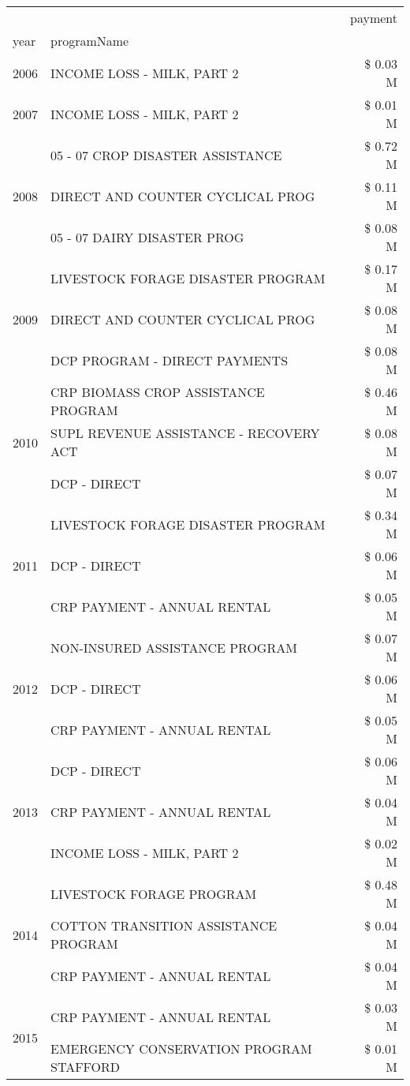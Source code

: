 \begin{tabular}{llr}
\toprule
 &  & payment \\
year & programName &  \\
\midrule
2006 & INCOME LOSS - MILK, PART 2 & \$ 0.03 M \\
\cline{1-3}
2007 & INCOME LOSS - MILK, PART 2 & \$ 0.01 M \\
\cline{1-3}
\multirow[t]{3}{*}{2008} & 05 - 07 CROP DISASTER ASSISTANCE & \$ 0.72 M \\
 & DIRECT AND COUNTER CYCLICAL PROG & \$ 0.11 M \\
 & 05 - 07 DAIRY DISASTER PROG & \$ 0.08 M \\
\cline{1-3}
\multirow[t]{3}{*}{2009} & LIVESTOCK FORAGE DISASTER  PROGRAM & \$ 0.17 M \\
 & DIRECT AND COUNTER CYCLICAL PROG & \$ 0.08 M \\
 & DCP PROGRAM - DIRECT PAYMENTS & \$ 0.08 M \\
\cline{1-3}
\multirow[t]{3}{*}{2010} & CRP BIOMASS CROP ASSISTANCE PROGRAM & \$ 0.46 M \\
 & SUPL REVENUE ASSISTANCE - RECOVERY ACT & \$ 0.08 M \\
 & DCP - DIRECT & \$ 0.07 M \\
\cline{1-3}
\multirow[t]{3}{*}{2011} & LIVESTOCK FORAGE DISASTER PROGRAM & \$ 0.34 M \\
 & DCP - DIRECT & \$ 0.06 M \\
 & CRP PAYMENT - ANNUAL RENTAL & \$ 0.05 M \\
\cline{1-3}
\multirow[t]{3}{*}{2012} & NON-INSURED ASSISTANCE PROGRAM & \$ 0.07 M \\
 & DCP - DIRECT & \$ 0.06 M \\
 & CRP PAYMENT - ANNUAL RENTAL & \$ 0.05 M \\
\cline{1-3}
\multirow[t]{3}{*}{2013} & DCP - DIRECT & \$ 0.06 M \\
 & CRP PAYMENT - ANNUAL RENTAL & \$ 0.04 M \\
 & INCOME LOSS - MILK, PART 2 & \$ 0.02 M \\
\cline{1-3}
\multirow[t]{3}{*}{2014} & LIVESTOCK FORAGE PROGRAM & \$ 0.48 M \\
 & COTTON TRANSITION ASSISTANCE PROGRAM & \$ 0.04 M \\
 & CRP PAYMENT - ANNUAL RENTAL & \$ 0.04 M \\
\cline{1-3}
\multirow[t]{3}{*}{2015} & CRP PAYMENT - ANNUAL RENTAL & \$ 0.03 M \\
 & EMERGENCY CONSERVATION PROGRAM STAFFORD & \$ 0.01 M \\

\end{tabular}
